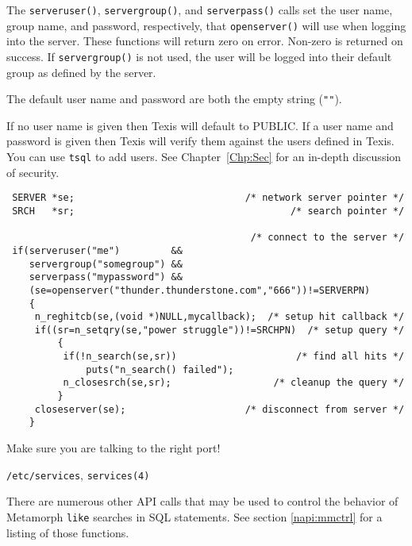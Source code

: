 The \verb`serveruser()`, \verb`servergroup()`, and \verb`serverpass()`
calls set the user name, group name, and password, respectively, that
\verb`openserver()` will use when logging into the server.  These
functions will return zero on error.  Non-zero is returned on success.
If \verb`servergroup()` is not used, the user will be logged into their
default group as defined by the server.

The default user name and password are both the empty string (\verb`""`).

If no user name is given then Texis will default to PUBLIC.  If a
user name and password is given then Texis will verify them against
the users defined in Texis.  You can use \verb`tsql` to add users.
See Chapter~\ref{Chp:Sec} for an in-depth discussion of security.

\EXAMPLE
\begin{verbatim}
 SERVER *se;                              /* network server pointer */
 SRCH   *sr;                                      /* search pointer */

                                           /* connect to the server */
 if(serveruser("me")         &&
    servergroup("somegroup") &&
    serverpass("mypassword") &&
    (se=openserver("thunder.thunderstone.com","666"))!=SERVERPN)
    {
     n_reghitcb(se,(void *)NULL,mycallback);  /* setup hit callback */
     if((sr=n_setqry(se,"power struggle"))!=SRCHPN)  /* setup query */
         {
          if(!n_search(se,sr))                     /* find all hits */
              puts("n_search() failed");
          n_closesrch(se,sr);                  /* cleanup the query */
         }
     closeserver(se);                     /* disconnect from server */
    }
\end{verbatim}

\CAVEATS
Make sure you are talking to the right port!

\SEE
\verb`/etc/services`, \verb`services(4)`


\DESCRIPTION

There are numerous other API calls that may be used to control the
behavior of Metamorph \verb`like` searches in SQL statements.
See section \ref{napi:mmctrl} for a listing of those functions.

